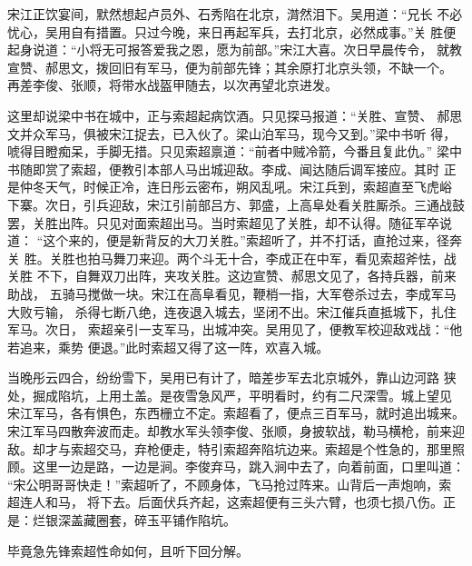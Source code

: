 宋江正饮宴间，默然想起卢员外、石秀陷在北京，潸然泪下。吴用道：“兄长
不必忧心，吴用自有措置。只过今晚，来日再起军兵，去打北京，必然成事。”关
胜便起身说道：“小将无可报答爱我之恩，愿为前部。”宋江大喜。次日早晨传令，
就教宣赞、郝思文，拨回旧有军马，便为前部先锋；其余原打北京头领，不缺一个。
再差李俊、张顺，将带水战盔甲随去，以次再望北京进发。

这里却说梁中书在城中，正与索超起病饮酒。只见探马报道：“关胜、宣赞、
郝思文并众军马，俱被宋江捉去，已入伙了。梁山泊军马，现今又到。”梁中书听
得，唬得目瞪痴呆，手脚无措。只见索超禀道：“前者中贼冷箭，今番且复此仇。”
梁中书随即赏了索超，便教引本部人马出城迎敌。李成、闻达随后调军接应。其时
正是仲冬天气，时候正冷，连日彤云密布，朔风乱吼。宋江兵到，索超直至飞虎峪
下寨。次日，引兵迎敌，宋江引前部吕方、郭盛，上高阜处看关胜厮杀。三通战鼓
罢，关胜出阵。只见对面索超出马。当时索超见了关胜，却不认得。随征军卒说道：
“这个来的，便是新背反的大刀关胜。”索超听了，并不打话，直抢过来，径奔关
胜。关胜也拍马舞刀来迎。两个斗无十合，李成正在中军，看见索超斧怯，战关胜
不下，自舞双刀出阵，夹攻关胜。这边宣赞、郝思文见了，各持兵器，前来助战，
五骑马搅做一块。宋江在高阜看见，鞭梢一指，大军卷杀过去，李成军马大败亏输，
杀得七断八绝，连夜退入城去，坚闭不出。宋江催兵直抵城下，扎住军马。次日，
索超亲引一支军马，出城冲突。吴用见了，便教军校迎敌戏战：“他若追来，乘势
便退。”此时索超又得了这一阵，欢喜入城。

当晚彤云四合，纷纷雪下，吴用已有计了，暗差步军去北京城外，靠山边河路
狭处，掘成陷坑，上用土盖。是夜雪急风严，平明看时，约有二尺深雪。城上望见
宋江军马，各有惧色，东西栅立不定。索超看了，便点三百军马，就时追出城来。
宋江军马四散奔波而走。却教水军头领李俊、张顺，身披软战，勒马横枪，前来迎
敌。却才与索超交马，弃枪便走，特引索超奔陷坑边来。索超是个性急的，那里照
顾。这里一边是路，一边是涧。李俊弃马，跳入涧中去了，向着前面，口里叫道：
“宋公明哥哥快走！”索超听了，不顾身体，飞马抢过阵来。山背后一声炮响，索
超连人和马，将下去。后面伏兵齐起，这索超便有三头六臂，也须七损八伤。正
是：烂银深盖藏圈套，碎玉平铺作陷坑。

毕竟急先锋索超性命如何，且听下回分解。
